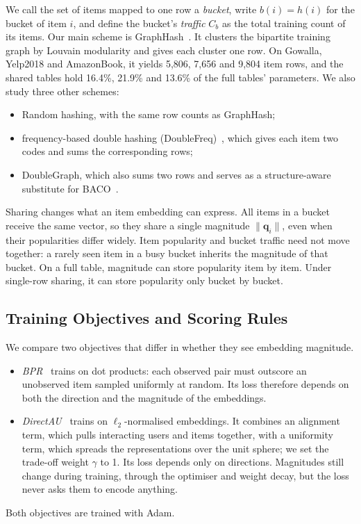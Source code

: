 We call the set of items mapped to one row a \emph{bucket}, write $b(i)=h(i)$ for the bucket of item $i$, and define the bucket's \emph{traffic} $C_b$ as the total training count of its items. Our main scheme is GraphHash~\cite{GraphHash}. It clusters the bipartite training graph by Louvain modularity and gives each cluster one row. On Gowalla, Yelp2018 and AmazonBook, it yields 5{,}806, 7{,}656 and 9{,}804 item rows, and the shared tables hold 16.4\%, 21.9\% and 13.6\% of the full tables' parameters. We also study three other schemes:
\begin{itemize}
  \item Random hashing, with the same row counts as GraphHash;
  \item frequency-based double hashing (DoubleFreq)~\cite{Zhang2020freq}, which gives each item two codes and sums the corresponding rows;
  \item DoubleGraph, which also sums two rows and serves as a structure-aware substitute for BACO~\cite{BACO}.
\end{itemize}

Sharing changes what an item embedding can express. All items in a bucket receive the same vector, so they share a single magnitude $\|\mathbf{q}_i\|$, even when their popularities differ widely. Item popularity and bucket traffic need not move together: a rarely seen item in a busy bucket inherits the magnitude of that bucket. On a full table, magnitude can store popularity item by item. Under single-row sharing, it can store popularity only bucket by bucket.

\subsection{Training Objectives and Scoring Rules}
\label{sec:prelim-scoring}

We compare two objectives that differ in whether they see embedding magnitude.
\begin{itemize}
  \item \emph{BPR}~\cite{BPR} trains on dot products: each observed pair must outscore an unobserved item sampled uniformly at random. Its loss therefore depends on both the direction and the magnitude of the embeddings.
  \item \emph{DirectAU}~\cite{DirectAU} trains on $\ell_2$-normalised embeddings. It combines an alignment term, which pulls interacting users and items together, with a uniformity term, which spreads the representations over the unit sphere; we set the trade-off weight $\gamma$ to 1. Its loss depends only on directions. Magnitudes still change during training, through the optimiser and weight decay, but the loss never asks them to encode anything.
\end{itemize}
Both objectives are trained with Adam.

